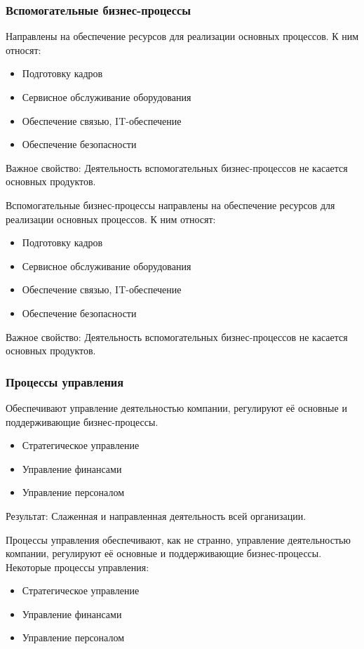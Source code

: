 \documentclass{../industrial-development}
\begin{document}
\begin{frame} \frametitle{Вспомогательные бизнес-процессы}
Направлены на обеспечение ресурсов для реализации основных процессов. К ним относят:
\begin{itemize}
	\item Подготовку кадров
	\item Сервисное обслуживание оборудования
	\item Обеспечение связью, IT-обеспечение
	\item Обеспечение безопасности
\end{itemize}
\begin {block}{Важное свойство:}
Деятельность \alert{вспомогательных} бизнес-процессов не касается основных продуктов.
\end {block}
\end{frame}
\lecturenotes
\alert{Вспомогательные бизнес-процессы} направлены на обеспечение ресурсов для реализации основных процессов. 
К ним относят:
\begin{itemize}
	\item Подготовку кадров
	\item Сервисное обслуживание оборудования
	\item Обеспечение связью, IT-обеспечение
	\item Обеспечение безопасности
\end{itemize}
\begin {block}{Важное свойство:}
Деятельность \alert{вспомогательных} бизнес-процессов не касается основных продуктов.
\end {block}


\begin{frame} \frametitle{Процессы управления}
Обеспечивают управление деятельностью компании, регулируют её основные и поддерживающие бизнес-процессы.
\begin{itemize}
	\item Стратегическое управление
	\item Управление финансами 
	\item Управление персоналом
\end{itemize}
\begin {block}{Результат:}
Слаженная и направленная деятельность всей организации.
\end {block}
\end{frame}
\lecturnotes
\alert{Процессы управления} обеспечивают, как не странно, \alert{управление}  деятельностью компании, регулируют её основные и поддерживающие бизнес-процессы.
Некоторые процессы управления:
\begin{itemize}
	\item Стратегическое управление
	\item Управление финансами 
	\item Управление персоналом
\end{itemize}
\end{document}
